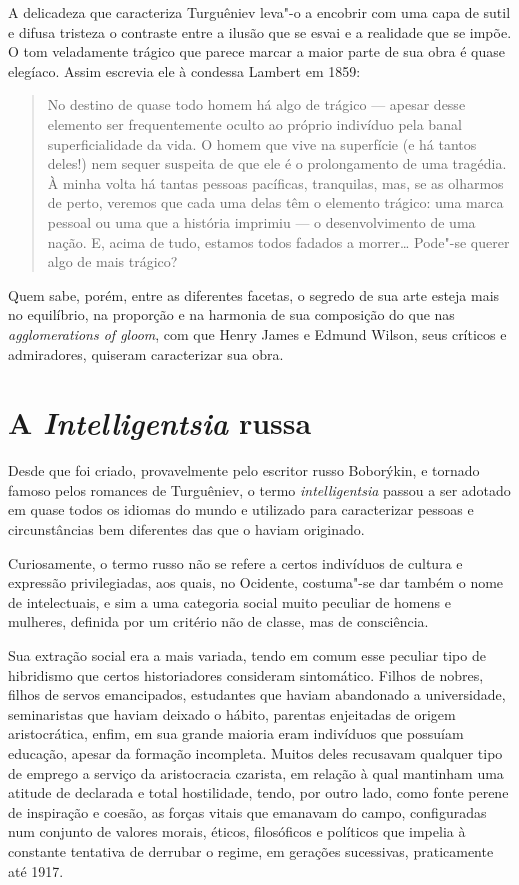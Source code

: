 A delicadeza que caracteriza Turguêniev leva"-o a encobrir com uma capa
de sutil e difusa tristeza o contraste entre a ilusão que se esvai e a
realidade que se impõe. O tom veladamente trágico que parece marcar a
maior parte de sua obra é quase elegíaco. Assim escrevia ele à condessa
Lambert em 1859:

\begin{quotation}
No destino de quase todo homem há algo de trágico --- apesar desse
elemento ser frequentemente oculto ao próprio indivíduo pela banal
superficialidade da vida. O homem que vive na superfície (e há tantos
deles!) nem sequer suspeita de que ele é o prolongamento de uma
tragédia. À minha volta há tantas pessoas pacíficas, tranquilas, mas, se as
olharmos de perto, veremos que cada uma delas têm o elemento trágico: uma
marca pessoal ou uma que a história imprimiu --- o desenvolvimento de uma
nação. E, acima de tudo, estamos todos fadados a morrer\ldots{} Pode"-se
querer algo de mais trágico?
\end{quotation}

Quem sabe, porém, entre as diferentes facetas, o segredo de sua arte esteja mais no
equilíbrio, na proporção e na harmonia de sua composição do que nas
\emph{agglomerations of gloom}, com que Henry James e Edmund Wilson, seus
críticos e admiradores, quiseram caracterizar sua obra.

\section{\uppercase{A} \emph{\uppercase{I}ntelligentsia} russa}

Desde que foi criado, provavelmente pelo escritor russo Boborýkin, e tornado
famoso pelos romances de Turguêniev, o termo \emph{intelligentsia}
passou a ser adotado em quase todos os idiomas do mundo e utilizado para
caracterizar pessoas e circunstâncias bem diferentes das que o haviam
originado.

Curiosamente, o termo russo não se refere a certos indivíduos de cultura
e expressão privilegiadas, aos quais, no Ocidente, costuma"-se dar também
o nome de intelectuais, e sim a uma categoria social muito peculiar de
homens e mulheres, definida por um critério não de classe, mas de
consciência.

Sua extração social era a mais variada, tendo em comum esse peculiar
tipo de hibridismo que certos historiadores consideram sintomático.
Filhos de nobres, filhos de servos emancipados, estudantes que haviam
abandonado a universidade, seminaristas que haviam deixado o hábito,
parentas enjeitadas de origem aristocrática, enfim, em sua grande maioria eram
indivíduos que possuíam educação, apesar da formação incompleta.
Muitos deles recusavam qualquer tipo de emprego a serviço da
aristocracia czarista, em relação à qual mantinham uma atitude de
declarada e total hostilidade, tendo, por outro lado, como fonte perene
de inspiração e coesão, as forças vitais que emanavam do campo,
configuradas num conjunto de valores morais, éticos, filosóficos e
políticos que impelia à constante tentativa de derrubar o regime, em
gerações sucessivas, praticamente até 1917.

